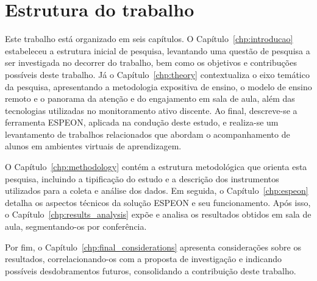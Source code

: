 \section{Estrutura do trabalho}\label{sec:structure}
Este trabalho está organizado em seis capítulos. O Capítulo~\ref{chp:introducao} estabeleceu a estrutura inicial de pesquisa, levantando uma questão de pesquisa a ser investigada no decorrer do trabalho, bem como os objetivos e contribuções possíveis deste trabalho. Já o Capítulo~\ref{chp:theory} contextualiza o eixo temático da pesquisa, apresentando a metodologia expositiva de ensino, o modelo de ensino remoto e o panorama da atenção e do engajamento em sala de aula, além das tecnologias utilizadas no monitoramento ativo discente. Ao final, descreve-se a ferramenta ESPEON, aplicada na condução deste estudo, e realiza-se um levantamento de trabalhos relacionados que abordam o acompanhamento de alunos em ambientes virtuais de aprendizagem.

O Capítulo~\ref{chp:methodology} contém a estrutura metodológica que orienta esta pesquisa, incluindo a tipificação do estudo e a descrição dos instrumentos utilizados para a coleta e análise dos dados. Em seguida, o Capítulo~\ref{chp:espeon} detalha os aspectos técnicos da solução ESPEON e seu funcionamento. Após isso, o Capítulo~\ref{chp:results_analysis} expõe e analisa os resultados obtidos em sala de aula, segmentando-os por conferência.

Por fim, o Capítulo~\ref{chp:final_considerations} apresenta considerações sobre os resultados, correlacionando-os com a proposta de investigação e indicando possíveis desdobramentos futuros, consolidando a contribuição deste trabalho.
